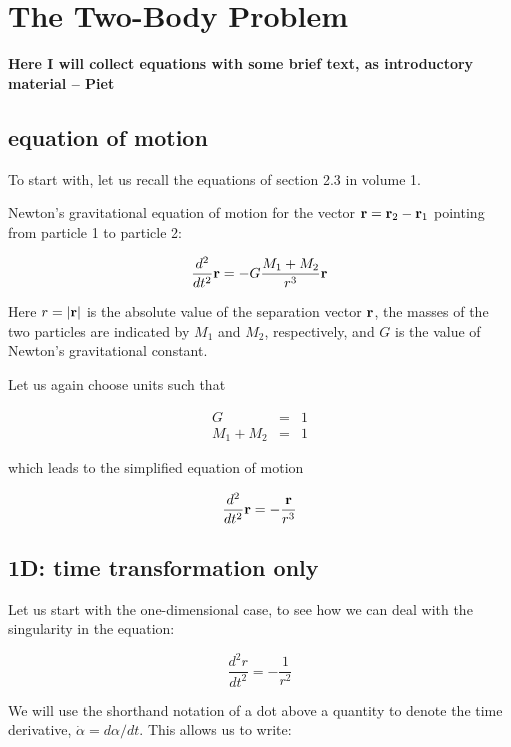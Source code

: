 \chapter{The Two-Body Problem}

{\bf Here I will collect equations with some brief text, as
introductory material -- Piet}

\section{equation of motion}

To start with, let us recall the equations of section 2.3 in volume 1.

Newton's gravitational equation of motion for the vector ${\bf r} = {\bf r}_2 - {\bf r}_1$
pointing from particle 1 to particle 2:

\begin{equation}
\frac{d^2}{dt^2}{\bf r} = - G \frac{M_1 + M_2}{r^3}{\bf r}
\end{equation}

Here $r = | {\bf r} |$ is the absolute value of the separation vector ${\bf r}$,
the masses of the two particles are indicated by $M_1$ and $M_2$,
respectively, and $G$ is the value of Newton's gravitational constant.


Let us again choose units such that

\begin{eqnarray}
G & = & 1 \\
M_1 + M_2 & = & 1
\end{eqnarray}

which leads to the simplified equation of motion

\begin{equation}
\frac{d^2}{dt^2}{\bf r} = - \frac{{\bf r}}{r^3} \label{newton-2-bodies}
\end{equation}

\section{1D: time transformation only}

Let us start with the one-dimensional case, to see how we can deal
with the singularity in the equation:

\begin{equation}
\frac{d^2r}{dt^2} = - \frac{1}{r^2}
\end{equation}

We will use the shorthand notation of a dot above a quantity to denote
the time derivative, \ie $\dot{\alpha} = d\alpha/dt$.  This
allows us to write:

